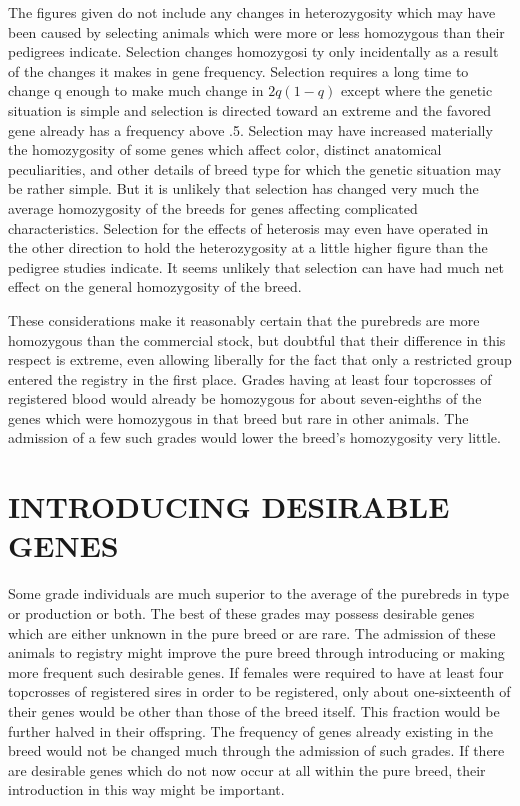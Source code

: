 The figures given do not include any changes in heterozygosity
which may have been caused by selecting animals which were more or
less homozygous than their pedigrees indicate. Selection changes homozygosi
ty only incidentally as a result of the changes it makes in gene
frequency. Selection requires a long time to change q enough to make
much change in $2q(1 - q)$ except where the genetic situation is simple
and selection is directed toward an extreme and the favored gene
already has a frequency above .5. Selection may have increased materially
the homozygosity of some genes which affect color, distinct
anatomical peculiarities, and other details of breed type for which the
genetic situation may be rather simple. But it is unlikely that selection
has changed very much the average homozygosity of the breeds for
genes affecting complicated characteristics. Selection for the effects of
heterosis may even have operated in the other direction to hold the
heterozygosity at a little higher figure than the pedigree studies indicate.
It seems unlikely that selection can have had much net effect on
the general homozygosity of the breed.

\nowidow
These considerations make it reasonably certain that the purebreds
are more homozygous than the commercial stock, but doubtful that
their difference in this respect is extreme, even allowing liberally for
the fact that only a restricted group entered the registry in the first
place. Grades having at least four topcrosses of registered blood would
already be homozygous for about seven-eighths of the genes which were
homozygous in that breed but rare in other animals. The admission of
a few such grades would lower the breed's homozygosity very little.

\section*{INTRODUCING DESIRABLE GENES}

Some grade individuals are much superior to the average of the
purebreds in type or production or both. The best of these grades may
possess desirable genes which are either unknown in the pure breed or
are rare. The admission of these animals to registry might improve the
pure breed through introducing or making more frequent such desirable
genes. If females were required to have at least four topcrosses of
registered sires in order to be registered, only about one-sixteenth of
their genes would be other than those of the breed itself. This fraction
would be further halved in their offspring. The frequency of genes
already existing in the breed would not be changed much through the
admission of such grades. If there are desirable genes which do not now
occur at all within the pure breed, their introduction in this way might
be important.

